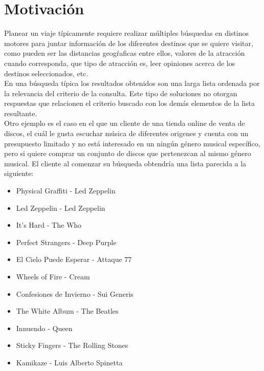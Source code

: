 \section{Motivación}
Planear un viaje típicamente requiere realizar múltiples búsquedas en distinos motores para juntar información de los diferentes destinos que se quiere visitar, como pueden ser las distancias geogŕaficas entre ellos, valores de la atracción cuando corresponda, que tipo de atracción es, leer opiniones acerca de los destinos seleccionados, etc.\\
En una búsqueda típica los resultados obtenidos son una larga lista ordenada por la relevancia del criterio de la consulta. Este tipo de soluciones no otorgan respuestas que relacionen el criterio buscado con los demás elementos de la lista resultante.\\
Otro ejemplo es el caso en el que un cliente de una tienda online de venta de discos, el cuál le gusta escuchar música de diferentes origenes y cuenta con un presupuesto limitado y no está interesado en un ningún género musical específico, pero si quiere comprar un conjunto de discos que pertenezcan al mismo género musical. El cliente al comenzar su búsqueda obtendría una lista parecida a la siguiente:
\begin{itemize}
  \item Physical Graffiti - Led Zeppelin
  \item Led Zeppelin - Led Zeppelin
  \item It's Hard - The Who
  \item Perfect Strangers - Deep Purple
  \item El Cielo Puede Esperar - Attaque 77
  \item Wheels of Fire - Cream
  \item Confesiones de Invierno - Sui Generis
  \item The White Album - The Beatles
  \item Innuendo - Queen
  \item Sticky Fingers - The Rolling Stones
  \item Kamikaze - Luis Alberto Spinetta
\end{itemize}

